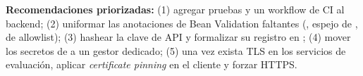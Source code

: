 \documentclass[11pt,a4paper]{article}
\begin{document}
\textbf{Recomendaciones priorizadas:} (1) agregar pruebas \texttt{} y un workflow de CI al backend; (2) uniformar las anotaciones de Bean Validation faltantes (\texttt{}, \texttt{} espejo de \texttt{}, \texttt{} de allowlist); (3) hashear la clave de API y formalizar su registro en \texttt{}; (4) mover los secretos de \texttt{} a un gestor dedicado; (5) una vez exista TLS en los servicios de evaluación, aplicar \emph{certificate pinning} en el cliente y forzar HTTPS.
\end{document}

